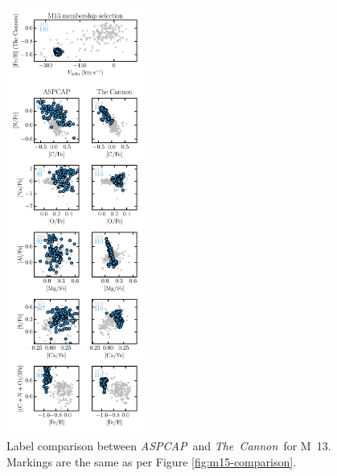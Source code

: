 \documentclass[12pt,preprint]{aastex}
\newcommand{\project}[1]{\textsl{#1}}
\newcommand{\TheCannon}{\project{The~Cannon}}
\newcommand{\acronym}[1]{{\small{#1}}}
\newcommand{\aspcap}{\project{\acronym{ASPCAP}}}
\begin{document}
\clearpage

\begin{figure}[p]
\includegraphics[width=0.4\textwidth]{M13_comparison.pdf}
\caption{Label comparison between \aspcap\ and \TheCannon\ for M~13.
Markings are the same as per Figure \ref{fig:m15-comparison}.
\label{fig:m13-comparison}}
\end{figure}

\clearpage
\end{document}
